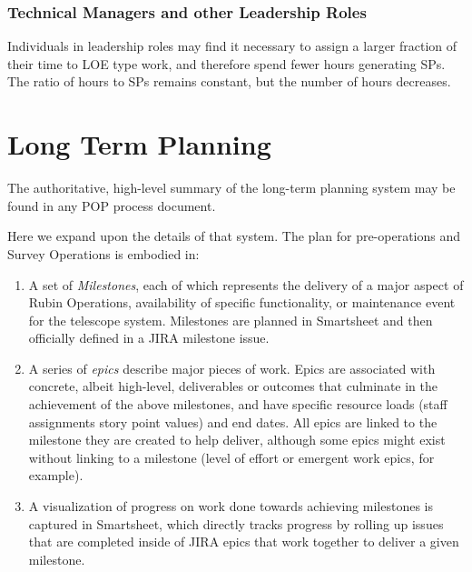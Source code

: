 \subsubsection{Technical Managers and other Leadership Roles}

Individuals in leadership roles may find it necessary to assign a larger fraction of their time to \gls{LOE} type work, and therefore spend fewer hours generating \glspl{SP}.
The ratio of hours to \glspl{SP} remains constant, but the number of hours decreases.


\section{Long Term Planning}
\label{sec:long-term-plan}

The authoritative, high-level summary of the long-term planning system may be found in any POP process document.

Here we expand upon the details of that system.
The plan for pre-operations and Survey Operations is embodied in:

\begin{enumerate}
    \item A set of \emph{Milestones}, each of which represents the delivery of a major aspect of Rubin Operations, availability of specific functionality, or maintenance event for the telescope system.
        Milestones are planned in Smartsheet and then officially defined in a \gls{JIRA} milestone issue.
    \item A series of \emph{epics} describe major pieces of work.
        Epics are associated with concrete, albeit high-level, deliverables or outcomes that culminate in the achievement of the above milestones, and have specific resource loads (staff assignments story point values) and end dates.
        All epics are linked to the milestone they are created to help deliver, although some epics might exist without linking to a milestone (level of effort or emergent work epics, for example).
    \item A visualization of progress on work done towards achieving milestones is captured in Smartsheet, which directly tracks progress by rolling up issues that are completed inside of \gls{JIRA} epics that work together to deliver a given milestone.
\end{enumerate}

